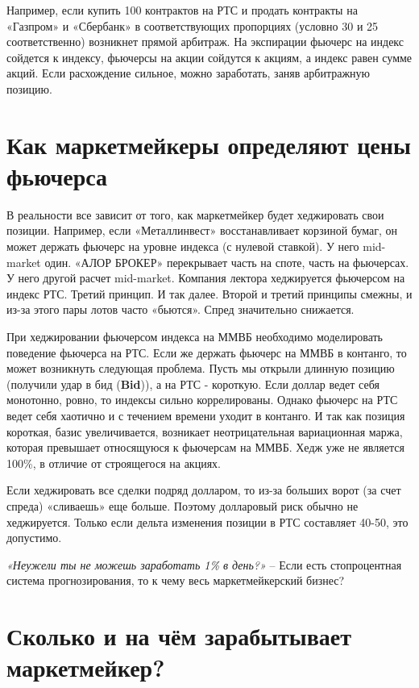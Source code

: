 \documentclass{article}
\begin{document}
Например, если купить 100 контрактов на РТС и продать контракты на «Газпром» и «Сбербанк» в соответствующих пропорциях (условно 30 и 25 соответственно) возникнет прямой арбитраж. На экспирации фьючерс на индекс сойдется к индексу, фьючерсы на акции сойдутся к акциям, а индекс равен сумме акций. Если расхождение сильное, можно заработать, заняв арбитражную позицию. 

\section{Как маркетмейкеры определяют цены фьючерса}

В реальности все зависит от того, как маркетмейкер будет хеджировать свои позиции. Например, если «Металлинвест» восстанавливает корзиной бумаг, он может держать фьючерс на уровне индекса (с нулевой ставкой). У него mid-market один. «АЛОР БРОКЕР» перекрывает часть на споте, часть на фьючерсах. У него другой расчет mid-market. Компания лектора хеджируется фьючерсом на индекс РТС. Третий принцип. И так далее. Второй и третий принципы смежны, и из-за этого пары лотов часто «бьются». Спред значительно снижается.  

При хеджировании фьючерсом индекса на ММВБ необходимо моделировать поведение фьючерса на РТС. Если же держать фьючерс на ММВБ в контанго, то может возникнуть следующая проблема. Пусть мы открыли длинную позицию (получили удар в бид (\textbf{Bid})), а на РТС - короткую. Если доллар ведет себя монотонно, ровно, то индексы сильно коррелированы. Однако фьючерс на РТС ведет себя хаотично и с течением времени уходит в контанго. И так как позиция короткая, базис увеличивается, возникает неотрицательная вариационная маржа, которая превышает относящуюся к фьючерсам на ММВБ. Хедж уже не является 100\%, в отличие от строящегося на акциях. 

Если хеджировать все сделки подряд долларом, то из-за больших ворот (за счет спреда) «сливаешь» еще больше. Поэтому долларовый риск обычно не хеджируется. Только если дельта изменения позиции в РТС составляет 40-50, это допустимо.

\emph{«Неужели ты не можешь заработать 1\% в день?»} – Если есть стопроцентная система прогнозирования, то к чему весь маркетмейкерский бизнес?

\section{Сколько и на чём зарабытывает маркетмейкер?}
\end{document}
